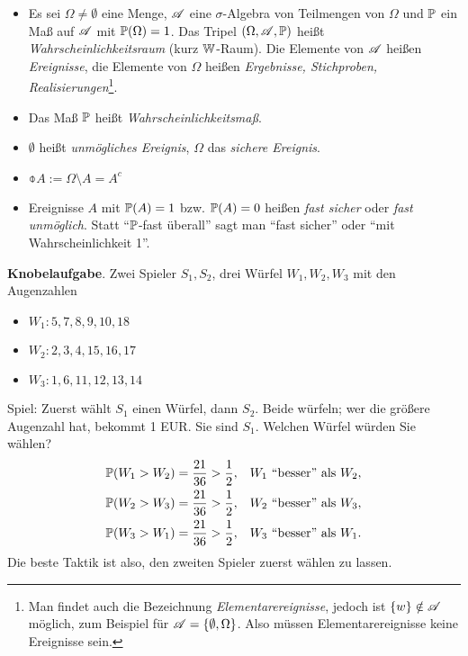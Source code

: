 \begin{defn}
  \begin{itemize}
  \item Es sei $\Omega \ne \emptyset$ eine Menge, $\mathscr{A}$ eine $\sigma$-Algebra von
  Teilmengen von $\Omega$ und $\mathbb{P}$ ein Maß auf $\mathscr{A}$ mit $\mathbb{P}(\Omega) = 1$. Das
  Tripel $(\Omega, \mathscr{A}, \mathbb{P})$ heißt \emph{Wahrscheinlichkeitsraum} (kurz
  $\mathbb{W}$-Raum). Die Elemente von $\mathscr{A}$ heißen \emph{Ereignisse}, die Elemente von
  $\Omega$ heißen \emph{Ergebnisse, Stichproben, Realisierungen}\footnote{%
    Man findet auch  die Bezeichnung \emph{Elementarereignisse}, jedoch ist $\{w\}
    \notin \mathscr{A}$ möglich, zum Beispiel für $\mathscr{A} = \{ \emptyset, \Omega \}$. Also
    müssen Elementarereignisse keine Ereignisse sein.}.
  \item Das Maß $\mathbb{P}$ heißt \emph{Wahrscheinlichkeitsmaß}.
  \item $\emptyset$ heißt \emph{unmögliches Ereignis}, $\Omega$ das \emph{sichere Ereignis}.
  \item $\obar{A} := \Omega \setminus A = A^c$
  \item Ereignisse $A$ mit $\mathbb{P}(A) = 1$ bzw. $\mathbb{P}(A) = 0$ heißen \emph{fast
      sicher} oder \emph{fast unmöglich}. Statt ``$\mathbb{P}$-fast überall'' sagt man
    ``fast sicher'' oder ``mit Wahrscheinlichkeit 1''.
  \end{itemize}
\end{defn}

\textbf{Knobelaufgabe}.
Zwei Spieler $S_1, S_2$, drei Würfel $W_1, W_2, W_3$ mit den Augenzahlen
\begin{itemize}
\item $W_1: 5, 7, 8, 9, 10, 18$
\item $W_2: 2, 3, 4, 15, 16, 17$
\item $W_3: 1, 6, 11, 12, 13, 14$
\end{itemize}
Spiel: Zuerst wählt $S_1$ einen Würfel, dann $S_2$. Beide würfeln; wer die
größere Augenzahl hat, bekommt 1 EUR. Sie sind $S_1$. Welchen Würfel würden Sie
wählen?
\begin{align*}
  \mathbb{P}( W_1 > W_2 ) &= \frac{21}{36} > \frac{1}{2}, & W_1 \text{ ``besser'' als } W_2, \\
  \mathbb{P}( W_2 > W_3 ) &= \frac{21}{36} > \frac{1}{2}, & W_2 \text{ ``besser'' als } W_3, \\
  \mathbb{P}( W_3 > W_1 ) &= \frac{21}{36} > \frac{1}{2}, & W_3 \text{ ``besser'' als } W_1.
\end{align*}
Die beste Taktik ist also, den zweiten Spieler zuerst wählen zu lassen.

